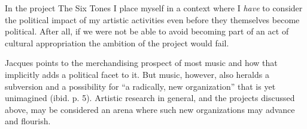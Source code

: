 \documentclass{article}
\begin{document}
In the project The Six Tones I place myself in a context where I \emph{have} to consider the political impact of my artistic activities even before they themselves become political. After all, if we were not be able to avoid becoming part of an act of cultural appropriation the ambition of the project would fail.

Jacques \citet{attali85} points to the merchandising prospect of most music and how that implicitly adds a political facet to it. But music, however, also heralds a subversion and a possibility for {\textquotedblleft}a radically, new organization{\textquotedblright} that is yet unimagined (ibid. p. 5). Artistic research in general, and the projects discussed above, may be considered an arena where such new organizations may advance and flourish.



\printbibliography
\end{document}
